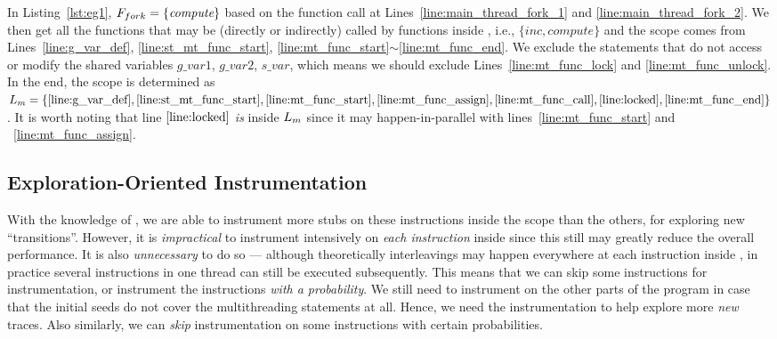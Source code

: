 In Listing~\ref{lst:eg1}, $F_{fork}=\{\emph{compute}\}$ based on the function call at Lines~\ref{line:main_thread_fork_1} and \ref{line:main_thread_fork_2}. We then get all the functions that may be (directly or indirectly) called by functions inside \FSStart, i.e., $\{inc, compute\}$ and the scope \mtiscope comes from Lines~\ref{line:g_var_def}, \ref{line:st_mt_func_start},
\ref{line:mt_func_start}$\sim$\ref{line:mt_func_end}.
We exclude the statements that do not access or modify the shared variables ${g\_var1}$, ${g\_var2}$, ${s\_var}$, 
which means we should exclude Lines~\ref{line:mt_func_lock} and \ref{line:mt_func_unlock}. In the end, the scope is determined as $L_{m}=\{\ref{line:g_var_def},\ref{line:st_mt_func_start},
\ref{line:mt_func_start},\ref{line:mt_func_assign},\ref{line:mt_func_call},\ref{line:locked},\ref{line:mt_func_end}\}$. It is worth noting that line $\ref{line:locked}$ \emph{is} inside $L_{m}$ since it may happen-in-parallel with lines~\ref{line:mt_func_start} and ~\ref{line:mt_func_assign}.


\subsection{Exploration-Oriented Instrumentation}\label{sec:instrument_explore}
With the knowledge of \mtiscope, we are able to instrument more stubs on these instructions inside the scope than the others, for exploring new ``transitions''. However, it is \emph{impractical} to instrument intensively on \emph{each instruction} inside \mtiscope since this still may greatly reduce the overall performance. It is also \emph{unnecessary} to do so --- although theoretically interleavings may happen everywhere at each instruction inside \mtiscope, in practice several instructions in one thread can still be executed subsequently. This means that we can skip some instructions for instrumentation, or instrument the instructions \emph{with a probability}.
We still need to instrument on the other parts of the program in case that the initial seeds do not cover the multithreading statements at all. Hence, we need the instrumentation to help explore more \emph{new} traces. Also similarly, we can \emph{skip} instrumentation on some instructions with certain probabilities.


